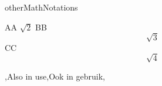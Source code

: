 \copyrightVincent


\begin{saveblock}{otherMathNotations}
	\begin{highlightblock}[gobble=8,linewidth=0.5\textwidth,
		framexleftmargin=0.25em,xleftmargin=0.25em]
		AA \(\sqrt{2}\)
		BB \[\sqrt{3}\]
		CC $$ \sqrt{4} $$
	\end{highlightblock}
\end{saveblock}

\addtorecentlist{\textbackslash [ \textellipsis\textbackslash]}

\begin{frame}{\lang,Also in use,Ook in gebruik,}
	\begin{columns}
		\begin{column}{0.5\textwidth}
		\end{column}
		\begin{column}{0.5\textwidth}
		\end{column}
	\end{columns}


\end{frame}
